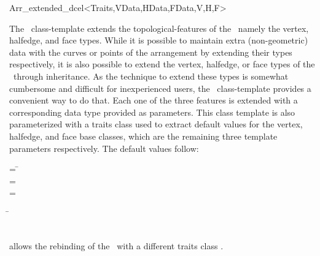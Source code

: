
\ccRefPageBegin

\begin{ccRefClass}{Arr_extended_dcel<Traits,VData,HData,FData,V,H,F>}

\ccDefinition
The \ccRefName\ class-template extends the topological-features of the \dcel\,
namely the vertex, halfedge, and face types. While it is possible to maintain
extra (non-geometric) data with the curves or points of the arrangement by
extending their types respectively, it is also possible to extend the vertex,
halfedge, or face types of the \dcel\ through inheritance. As the technique to
extend these types is somewhat cumbersome and difficult for inexperienced
users, the \ccRefName\ class-template provides a convenient way to do that.
Each one of the three features is extended with a corresponding data type
provided as parameters. This class template is also parameterized with a
traits class used to extract default values for the vertex, halfedge, and face
base classes, which are the remaining three template parameters respectively.
The default values follow:

\begin{tabbing}
 = \=\\
 = \>\\
 = \>
\end{tabbing}


\ccIsModel

\ccInheritsFrom
  \begin{tabbing}
  \=\\
                      \>\\
                      \>
  \end{tabbing}

\ccTypes

  {allows the rebinding of the \dcel\ with a different traits class .}

\ccSeeAlso


\end{ccRefClass}

\ccRefPageEnd
